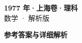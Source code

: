 \documentclass[zihao=-4, a4paper]{ctexart}
\begin{document}
\begin{center}
  {\Large\bfseries 1977 年·上海卷·理科}\\[4pt]
  {\large 数学 · 解析版}
\end{center}
\medskip
{}

\clearpage
{}
\begin{center}{\Large\bfseries 参考答案与详细解析}\end{center}
\medskip

\end{document}
